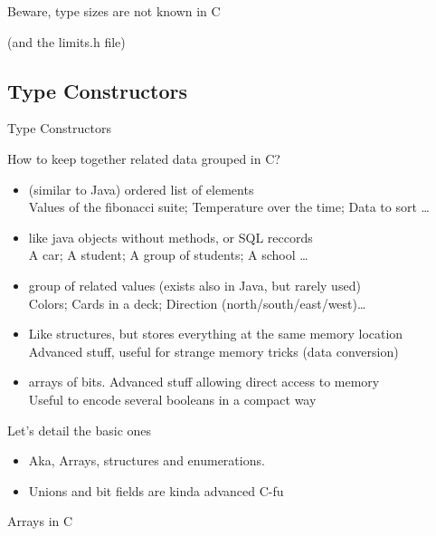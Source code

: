 \begin{Coupe}
\begin{frame}{Beware, type sizes are not known in C}
  \bigskip

  (and the limits.h file)
\end{frame}
\subsection{Type Constructors}\subtoc 
\begin{frame}{Type Constructors}
  \begin{block}{How to keep together related data grouped in C?}
    \begin{itemize}
    \item {} (similar to Java) ordered list of elements\\
      {\small{} Values of the fibonacci suite; Temperature over the time;
      Data to sort \ldots}
    \item {} like java objects without methods, or SQL
      reccords\\
      {\small{} A car; A student; A group of students; A school \ldots}
    \item {} group of related values (exists also in
      Java, but rarely used)\\
      {\small{} Colors; Cards in a deck; Direction
      (north/south/east/west)\ldots}
      \medskip
    \item {} Like structures, but stores everything at the
      same memory location\\ 
      {\small Advanced stuff, useful for strange memory tricks (data conversion)}
    \item {} arrays of bits. Advanced stuff allowing
      direct access to memory\\
      {\small Useful to encode several booleans in a compact way}
    \end{itemize}
  \end{block}
  \begin{block}{Let's detail the basic ones}
    \begin{itemize}
    \item Aka, Arrays, structures and enumerations.
    \item Unions and bit fields are kinda advanced C-fu
    \end{itemize}
  \end{block}
\end{frame}
\begin{frame}{Arrays in C}


\end{frame}
\end{Coupe}
